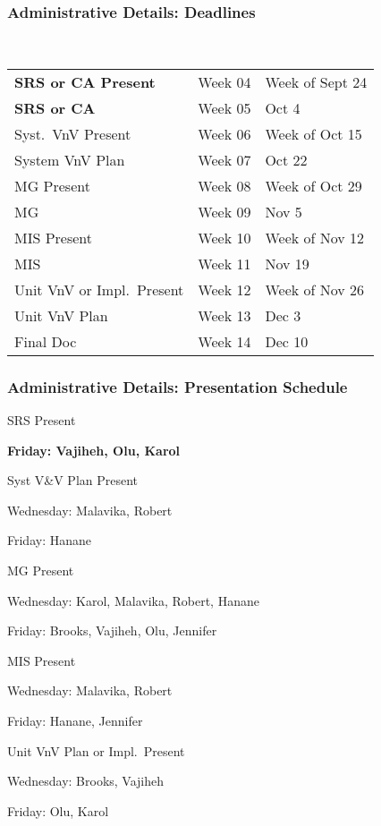 \documentclass[t,12pt,numbers,fleqn]{beamer}
\begin{document}



\begin{frame}
\frametitle{Administrative Details: Deadlines}

~\newline
\begin{tabular}{l l l}
\textbf{SRS or CA Present} & Week 04 & Week of Sept 24\\
\textbf{SRS or CA} & Week 05 & Oct 4\\
Syst.\ VnV Present & Week 06 & Week of Oct 15\\
System VnV Plan & Week 07 & Oct 22\\
MG Present & Week 08 & Week of Oct 29\\
MG & Week 09 & Nov 5\\
MIS Present & Week 10 & Week of Nov 12\\
MIS & Week 11 & Nov 19\\
Unit VnV or Impl.\ Present & Week 12 & Week of Nov 26\\
Unit VnV Plan & Week 13 & Dec 3\\
Final Doc & Week 14 & Dec 10\\
\end {tabular}

\end{frame}


\begin{frame}
\frametitle{Administrative Details: Presentation Schedule}

\bi
\item SRS Present
\bi
\item \textbf{Friday: Vajiheh, Olu, Karol}
\ei
\item Syst V\&V Plan Present
\bi
\item Wednesday: Malavika, Robert
\item Friday: Hanane
\ei
\item MG Present
\bi
\item Wednesday: Karol, Malavika, Robert, Hanane
\item Friday: Brooks, Vajiheh, Olu, Jennifer
\ei
\item MIS Present
\bi
\item Wednesday: Malavika, Robert
\item Friday: Hanane,  Jennifer
\ei
\item Unit VnV Plan or Impl.\ Present
\bi
\item Wednesday: Brooks, Vajiheh
\item Friday: Olu, Karol
\ei

\ei

\end{frame}
\end{document}

